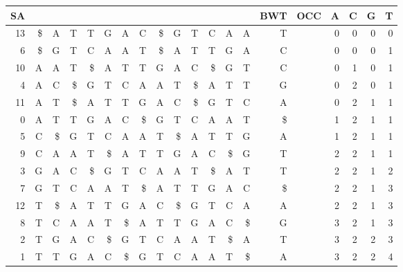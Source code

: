 \begin{tabular}{|r|>{\columncolor[gray]{0.8}}r|rrrrrrrrrrrr|>{\columncolor[gray]{0.8}}r| r |rrrr|}
\hline
SA & &  &   &   &   &   &   &   &   &   &   &   &   &    BWT & OCC & A & C & G & T \\
\hline
13 & \$ & A & T & T & G & A & C & \$ & G & T & C & A & A & T&&0&0&0&0\\
6 & \$ & G & T & C & A & A & T & \$ & A & T & T & G & A & C&&0&0&0&1\\
 \hline
10 & A & A & T & \$ & A & T & T & G & A & C & \$ & G & T & C&&0&1&0&1\\
4 & A & C & \$ & G & T & C & A & A & T & \$ & A & T & T & G&&0&2&0&1\\
11 & A & T & \$ & A & T & T & G & A & C & \$ & G & T & C & A&&0&2&1&1\\
0 & A & T & T & G & A & C & \$ & G & T & C & A & A & T & \$&&1&2&1&1\\
 \hline
5 & C & \$ & G & T & C & A & A & T & \$ & A & T & T & G & A&&1&2&1&1\\
9 & C & A & A & T & \$ & A & T & T & G & A & C & \$ & G & T&&2&2&1&1\\
 \hline
3 & G & A & C & \$ & G & T & C & A & A & T & \$ & A & T & T&&2&2&1&2\\
7 & G & T & C & A & A & T & \$ & A & T & T & G & A & C & \$&&2&2&1&3\\
 \hline
12 & T & \$ & A & T & T & G & A & C & \$ & G & T & C & A & A&&2&2&1&3\\
8 & T & C & A & A & T & \$ & A & T & T & G & A & C & \$ & G&&3&2&1&3\\
2 & T & G & A & C & \$ & G & T & C & A & A & T & \$ & A & T&&3&2&2&3\\
1 & T & T & G & A & C & \$ & G & T & C & A & A & T & \$ & A&&3&2&2&4\\
 \hline
\end{tabular}
